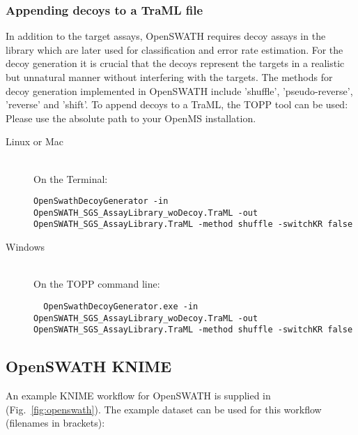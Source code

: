 \subsubsection{Appending decoys to a TraML file}
In addition to the target assays, OpenSWATH requires decoy assays in the library which are later used for classification and error rate estimation. For the decoy generation it is crucial that the decoys represent the targets in a realistic but unnatural manner without interfering with the targets. The methods for decoy generation implemented in OpenSWATH include 'shuffle', 'pseudo-reverse', 'reverse' and 'shift'. To append decoys to a TraML, the TOPP tool  can be used: Please use the absolute path to your OpenMS installation.

\begin{description}
  \item[Linux or Mac] \hfill \\
    On the Terminal:
    \begin{code}
	\begin{verbatim}
OpenSwathDecoyGenerator -in OpenSWATH_SGS_AssayLibrary_woDecoy.TraML -out OpenSWATH_SGS_AssayLibrary.TraML -method shuffle -switchKR false
    \end{verbatim}
	\end{code}
  \item[Windows] \hfill \\
    On the TOPP command line:
    \begin{code}
	\begin{verbatim}
  OpenSwathDecoyGenerator.exe -in OpenSWATH_SGS_AssayLibrary_woDecoy.TraML -out OpenSWATH_SGS_AssayLibrary.TraML -method shuffle -switchKR false
    \end{verbatim}
	\end{code}
\end{description}

\subsection{OpenSWATH KNIME}
An example KNIME workflow for OpenSWATH is supplied in  (Fig.~\ref{fig:openswath}). The example dataset can be used for this workflow (filenames in brackets):

